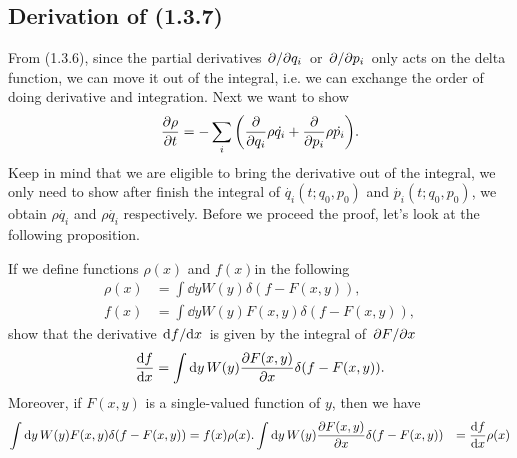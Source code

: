 \documentclass[10pt]{article}
\begin{document}
\subsection{Derivation of (1.3.7)}
From (1.3.6), since the partial derivatives $\pdv*{q_i}$ or $\pdv*{p_i}$ only acts on the delta function, we can move it out of the integral, i.e. we can exchange the order of doing derivative and integration. Next we want to show
\begin{equation}
	\pdv{\rho}{t} = -\sum_i \qty(\pdv{q_i} \rho \dot{q_i} + \pdv{p_i} \rho \dot{p_i}).
\end{equation}
Keep in mind that we are eligible to bring the derivative out of the integral, we only need to show after finish the integral of $\dot{q_i}(t;q_0,p_0)$ and $\dot{p_i}(t;q_0,p_0)$, we obtain $\rho \dot{q_i}$ and $\rho \dot{q_i}$ respectively. Before we proceed the proof, let's look at the following proposition.
\begin{lemma}
	If we define functions $\rho(x)$ and $f(x)$in the following
	\begin{align}
		\rho(x) &= \int \dd{y} W(y) \delta(f - F(x,y)), \\
		f(x) &= \int \dd{y} W(y) F(x,y) \delta(f - F(x,y)), \label{eq: 1.6.1}
	\end{align}
	show that the derivative $\dv*{f}{x}$ is given by the integral of $\pdv*{F}{x}$
	\begin{equation}
		\dv{f}{x} = \int \dd{y} W(y) \pdv{F(x,y)}{x} \delta(f - F(x,y)).
	\end{equation}
	Moreover, if $F(x,y)$ is a single-valued function of $y$, then we have
	\begin{align*}
		\int \dd{y} W(y) F(x,y) \delta(f - F(x,y)) &= f(x) \rho(x).
		\int \dd{y} W(y) \pdv{F(x,y)}{x} \delta(f - F(x,y)) &= \dv{f}{x} \rho(x)
	\end{align*}
\end{lemma}
\end{document}
